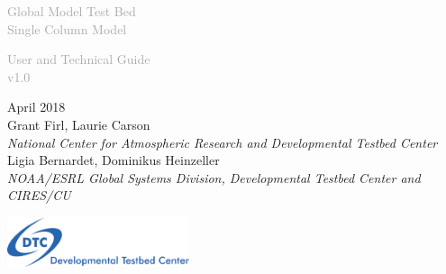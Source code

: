 \begin{titlepage}
\renewcommand{\thefootnote}{\fnsymbol{footnote}}

\vspace*{0.5em}
\noindent

\begin{center}
\textcolor{darkgray}{\bigsf Global Model Test Bed \\[0.75ex]  Single Column Model\\}
\vspace*{3em}\par

\textcolor{darkgray}{\bigst User and Technical Guide \\[0.5ex] v1.0}
\vspace*{1em}\par

\large{April 2018}\\[4em]

Grant Firl, Laurie Carson\\
\textit{\small{National Center for Atmospheric Research and Developmental Testbed Center}}\\[4em]

Ligia Bernardet, Dominikus Heinzeller\\
\textit{\small{NOAA/ESRL Global Systems Division, Developmental Testbed Center and CIRES/CU}}\\[4em]

\vspace{4em}

\includegraphics[width=0.4\textwidth]{images/dtc_logo.png}\\[2em]

\end{center}
\end{titlepage}
\pagebreak{}




